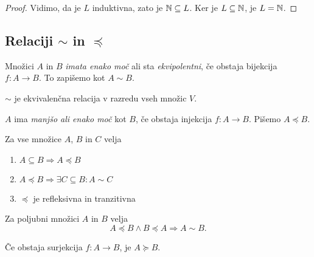 \documentclass[12pt, a4paper]{article}
\renewcommand{\implies}{\Rightarrow}
\begin{document}
\begin{proof}
Vidimo, da je $L$ induktivna, zato je $\mathbb{N}\subseteq L$. Ker je $L\subseteq\mathbb{N}$, je $L=\mathbb{N}$.
\end{proof}

\newpage

\subsection{Relaciji $\sim$ in $\preccurlyeq$}

\begin{okvir}
\begin{definicija}
Množici $A$ in $B$ \emph{imata enako moč} ali sta \emph{ekvipolentni}, če obstaja bijekcija $f\colon A\to B$. To zapišemo kot $A\sim B$.
\end{definicija}
\end{okvir}

\begin{trditev}
$\sim$ je ekvivalenčna relacija v razredu vseh množic $V$.
\end{trditev}

\obvs

\begin{okvir}
\begin{definicija}
$A$ ima \emph{manjšo ali enako moč} kot $B$, če obstaja injekcija $f\colon A\to B$. Pišemo $A\preccurlyeq B$.
\end{definicija}
\end{okvir}

\begin{trditev}
Za vse množice $A$, $B$ in $C$ velja

\begin{enumerate}
\item $A\subseteq B\implies A\preccurlyeq B$
\item $A\preccurlyeq B\implies \exists C\subseteq B\colon A\sim C$
\item $\preccurlyeq$ je refleksivna in tranzitivna 
\end{enumerate}
\end{trditev}

\obvs

\begin{izrek}
Za poljubni množici $A$ in $B$ velja
\[
A\preccurlyeq B\land B\preccurlyeq A\implies A\sim B.
\]
\end{izrek}

\begin{izrek}
Če obstaja surjekcija $f\colon A\to B$, je $A\succcurlyeq B$.
\end{izrek}
\end{document}

